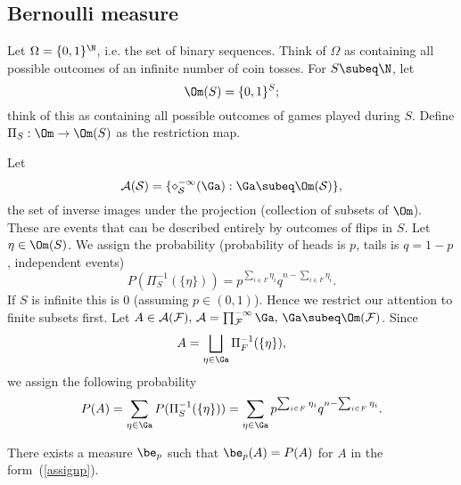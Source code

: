 
\subsection{Bernoulli measure}
Let $\Omega=\{0,1\}^{\N}$, i.e. the set of binary sequences. Think of $\Omega$ as containing all possible outcomes of an infinite number of coin tosses. For $S\subeq \N$, let
\[
\Om(S)=\{0,1\}^S;
\]
think of this as containing all possible outcomes of games played during $S$. Define $\Pi_S:\Om\to \Om(S)$ as the restriction map.

Let
\[
\cal A(S)=\{\Pi_S^{-1}(\Ga):\Ga\subeq \Om(S)\},
\]
the set of inverse images under the projection (collection of subsets of $\Om$). These are events that can be described entirely by outcomes of flips in $S$.
Let $\eta\in \Om(S)$. We assign the probability (probability of heads is $p$, tails is $q=1-p$, independent events)
\begin{equation}\label{assignp}
P(\Pi_S^{-1}(\{\eta\}))=p^{\sum_{i\in F}\eta_i}q^{n-\sum_{i\in F} \eta_i}.
\end{equation}
If $S$ is infinite this is 0 (assuming $p\in (0,1)$). Hence we restrict our attention to finite subsets first. Let $A\in \cal A(F),\,A=\prod_{F}^{-1}\Ga,\,\Ga\subeq \Om(F)$. 
Since
\[
A=\bigsqcup_{\eta\in \Ga} \Pi_F^{-1}(\{\eta\}),
\]
we assign the following probability
\[
P(A)=\sum_{\eta\in \Ga}P(\Pi_S^{-1}(\{\eta\}))=\sum_{\eta\in \Ga} p^{\sum_{i\in F}\eta_i}q^{n-\sum_{i\in F} \eta_i}.
\]
\begin{thm}
There exists a measure $\be_p$ such that $\be_p(A)=P(A)$ for $A$ in the form~(\ref{assignp}).
\end{thm}
